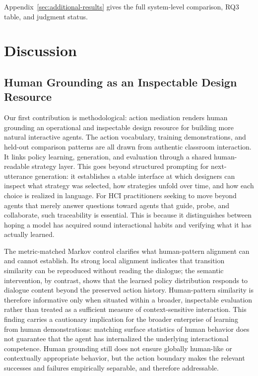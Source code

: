 \documentclass[manuscript,review,anonymous]{acmart}
\begin{document}
Appendix~\ref{sec:additional-results} gives the full system-level comparison,
RQ3 table, and judgment status.
 
\section{Discussion}

\subsection{Human Grounding as an Inspectable Design Resource}

Our first contribution is methodological: action mediation renders human
grounding an operational and inspectable design resource for building more
natural interactive agents. The action vocabulary, training demonstrations,
and held-out comparison patterns are all drawn from authentic classroom
interaction. It links policy learning, generation, and evaluation through a
shared human-readable strategy layer. This goes beyond structured prompting for
next-utterance generation: it establishes a stable interface at which designers
can inspect what strategy was selected, how strategies unfold over time, and
how each choice is realized in language. For HCI practitioners seeking to move
beyond agents that merely answer questions toward agents that guide, probe, and
collaborate, such traceability is essential. This is because it distinguishes
between hoping a model has acquired sound interactional habits and verifying
what it has actually learned.

The metric-matched Markov control clarifies what human-pattern alignment can and
cannot establish. Its strong local alignment indicates that transition
similarity can be reproduced without reading the dialogue; the semantic
intervention, by contrast, shows that the learned policy distribution responds
to dialogue content beyond the preserved action history. Human-pattern
similarity is therefore informative only when situated within a broader,
inspectable evaluation rather than treated as a sufficient measure of
context-sensitive interaction. This finding carries a cautionary implication
for the broader enterprise of learning from human demonstrations: matching
surface statistics of human behavior does not guarantee that the agent has
internalized the underlying interactional competence. Human grounding still
does not ensure globally human-like or contextually appropriate behavior, but
the action boundary makes the relevant successes and failures empirically
separable, and therefore addressable.
\end{document}
